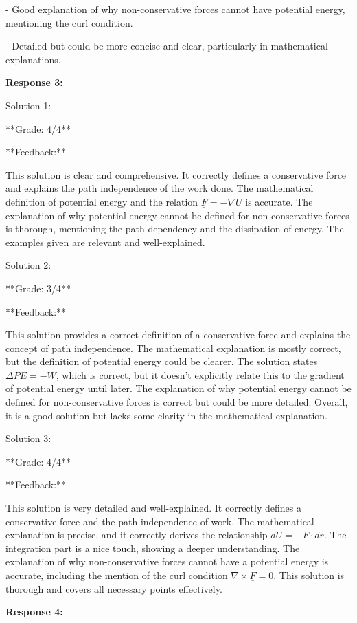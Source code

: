 \documentclass[a4paper,11pt]{article}
\begin{document}
- Good explanation of why non-conservative forces cannot have potential energy, mentioning the curl condition.

- Detailed but could be more concise and clear, particularly in mathematical explanations.

\bigskip
\textbf{Response 3:}

Solution 1:

**Grade: 4/4**

**Feedback:**

This solution is clear and comprehensive. It correctly defines a conservative force and explains the path independence of the work done. The mathematical definition of potential energy and the relation \( \underline{F} = -\nabla U \) is accurate. The explanation of why potential energy cannot be defined for non-conservative forces is thorough, mentioning the path dependency and the dissipation of energy. The examples given are relevant and well-explained.

Solution 2:

**Grade: 3/4**

**Feedback:**

This solution provides a correct definition of a conservative force and explains the concept of path independence. The mathematical explanation is mostly correct, but the definition of potential energy could be clearer. The solution states \( \Delta PE = -W \), which is correct, but it doesn't explicitly relate this to the gradient of potential energy until later. The explanation of why potential energy cannot be defined for non-conservative forces is correct but could be more detailed. Overall, it is a good solution but lacks some clarity in the mathematical explanation.

Solution 3:

**Grade: 4/4**

**Feedback:**

This solution is very detailed and well-explained. It correctly defines a conservative force and the path independence of work. The mathematical explanation is precise, and it correctly derives the relationship \( dU = -\underline{F} \cdot d\underline{r} \). The integration part is a nice touch, showing a deeper understanding. The explanation of why non-conservative forces cannot have a potential energy is accurate, including the mention of the curl condition \( \nabla \times \underline{F} = 0 \). This solution is thorough and covers all necessary points effectively.

\bigskip
\textbf{Response 4:}
\end{document}
